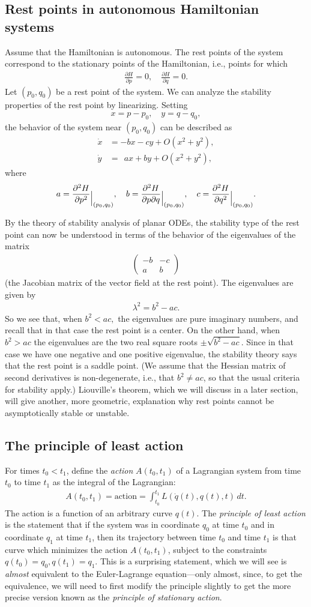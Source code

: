 \documentclass[12pt]{amsart}
\newcommand{\eqst}[1]{\begin{align*}#1\end{align*}}
\newcommand{\pder}[2]{\frac{\partial#1}{\partial#2}}
\begin{document}
\subsection{Rest points in autonomous Hamiltonian systems} Assume that the Hamiltonian is autonomous. The rest points of the system correspond to the stationary points of the Hamiltonian, i.e., points for which
\eqst{ \pder{H}{p} = 0, \quad \pder{H}{q} = 0. }
Let $(p_0,q_0)$ be a rest point of the system. We can analyze the stability properties of the rest point by linearizing. Setting
\eqst{ x = p-p_0, \quad y=q-q_0, }
the behavior of the system near $(p_0,q_0)$ can be described as
\eqst{
\dot{x} &= -bx-cy + O(x^2+y^2), \\ \dot{y}&= \ \ ax+by + O(x^2+y^2),
}
where
\eqst{
a = \frac{\partial^2 H}{\partial p^2} \raisebox{-5pt}{\Big|}_{(p_0,q_0)},\quad
b = \frac{\partial^2 H}{\partial p \partial q} \raisebox{-5pt}{\Big|}_{(p_0,q_0)}, \quad
c = \frac{\partial^2 H}{\partial q^2} \raisebox{-5pt}{\Big|}_{(p_0,q_0)}.
}

By the theory of stability analysis of planar ODEs, the stability type of the rest point can now be understood in terms of the behavior of the eigenvalues of the matrix
\eqst{ \left(\begin{array}{cc} -b&-c\\a&b\end{array}\right) }
(the Jacobian matrix of the vector field at the rest point). The eigenvalues are given by
\eqst{ \lambda^2 = b^2-ac. }
So we see that, when $b^2<ac,$ the eigenvalues are pure imaginary numbers, and recall that in that case the rest point is a center. On the other hand, when $b^2>ac$ the eigenvalues are the two real square roots $\pm \sqrt{b^2-ac}$. Since in that case we have one negative and one positive eigenvalue, the stability theory says that the rest point is a saddle point. (We assume that the Hessian matrix of second derivatives is non-degenerate, i.e., that $b^2\neq ac$, so that the usual criteria for stability apply.)
Liouville's theorem, which we will discuss in a later section, will give another, more geometric, explanation why rest points cannot be asymptotically stable or unstable.


\subsection{The principle of least action} For times $t_0<t_1$, define the \emph{action} $A(t_0,t_1)$ of a Lagrangian system from time $t_0$ to time $t_1$ as the integral of the Lagrangian:
\eqst{
A(t_0,t_1)=\textrm{action} = \int_{t_0}^{t_1} L(\dot{q}(t),q(t),t)\,dt.
}
The action is a function of an arbitrary curve $q(t)$.
The \emph{principle of least action} is the statement that if the system was in coordinate $q_0$ at time $t_0$ and in coordinate $q_1$ at time $t_1$, then its trajectory between time $t_0$ and time $t_1$ is that curve which minimizes the action $A(t_0,t_1)$, subject to the constraints $q(t_0)=q_0, q(t_1)=q_1$. This is a surprising statement, which we will see is \emph{almost} equivalent to the Euler-Lagrange equation---only almost, since, to get the equivalence, we will need to first modify the principle slightly to get the more precise version known as the \emph{principle of stationary action}.
\end{document}
